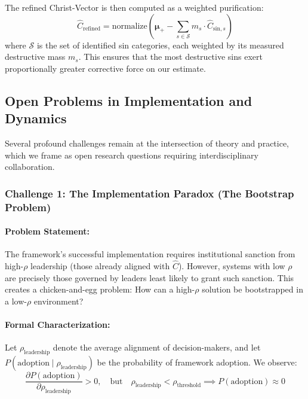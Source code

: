 \documentclass[11pt,a4paper]{article}
\theoremstyle{definition}
\theoremstyle{remark}
\begin{document}
The refined Christ-Vector is then computed as a weighted purification:
\begin{equation}
\hat{C}_{\text{refined}} = \text{normalize}\left(\boldsymbol{\mu}_+ - \sum_{s \in \mathcal{S}} m_s \cdot \hat{C}_{\text{sin}, s}\right)
\end{equation}
where \(\mathcal{S}\) is the set of identified sin categories, each weighted by its measured destructive mass \(m_s\). This ensures that the most destructive sins exert proportionally greater corrective force on our estimate.

\subsection{Open Problems in Implementation and Dynamics}

Several profound challenges remain at the intersection of theory and practice, which we frame as open research questions requiring interdisciplinary collaboration.

\subsubsection{Challenge 1: The Implementation Paradox (The Bootstrap Problem)}

\paragraph{Problem Statement:} 
The framework's successful implementation requires institutional sanction from high-\(\rho\) leadership (those already aligned with \(\hat{C}\)). However, systems with low \(\rho\) are precisely those governed by leaders least likely to grant such sanction. This creates a chicken-and-egg problem: How can a high-\(\rho\) solution be bootstrapped in a low-\(\rho\) environment?

\paragraph{Formal Characterization:}
Let \(\rho_{\text{leadership}}\) denote the average alignment of decision-makers, and let \(P(\text{adoption} \mid \rho_{\text{leadership}})\) be the probability of framework adoption. We observe:
\begin{equation}
\frac{\partial P(\text{adoption})}{\partial \rho_{\text{leadership}}} > 0, \quad \text{but} \quad \rho_{\text{leadership}} < \rho_{\text{threshold}} \implies P(\text{adoption}) \approx 0
\end{equation}
\end{document}
